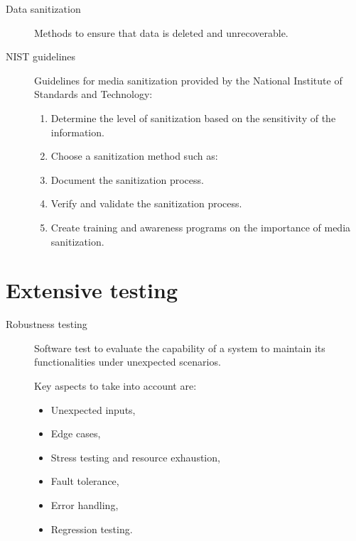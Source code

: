 \begin{description}
    \item[Data sanitization] 
        Methods to ensure that data is deleted and unrecoverable.


    \item[NIST guidelines] 
        Guidelines for media sanitization provided by the National Institute of Standards and Technology:
        \begin{enumerate}
            \item Determine the level of sanitization based on the sensitivity of the information.
            \item Choose a sanitization method such as:
            \item Document the sanitization process.
            \item Verify and validate the sanitization process.
            \item Create training and awareness programs on the importance of media sanitization.
        \end{enumerate}
\end{description}



\section{Extensive testing}

\begin{description}
    \item[Robustness testing] 
        Software test to evaluate the capability of a system to maintain its functionalities under unexpected scenarios.

        Key aspects to take into account are:
        \begin{itemize}
            \item Unexpected inputs,
            \item Edge cases,
            \item Stress testing and resource exhaustion,
            \item Fault tolerance,
            \item Error handling,
            \item Regression testing.
        \end{itemize}
\end{description}


